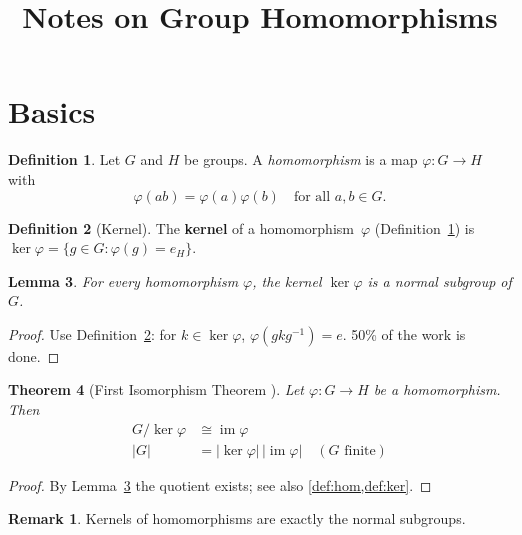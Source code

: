 \documentclass{amsart}
\title{Notes on Group Homomorphisms}
\newtheorem{thm}{Theorem}[section]
\newtheorem{lem}[thm]{Lemma}
\theoremstyle{definition}
\newtheorem{defn}[thm]{Definition}
\newtheorem*{rem}{Remark}
\begin{document}
\maketitle
\section{Basics}
\begin{defn}\label{def:hom}
Let $G$ and $H$ be groups. A \emph{homomorphism} is a map $\varphi\colon G \to H$ with
\[ \varphi(ab) = \varphi(a)\varphi(b) \quad\text{for all } a, b \in G. \]
\end{defn}

\begin{defn}[Kernel]\label{def:ker}
The \textbf{kernel} of a homomorphism~$\varphi$ (Definition~\ref{def:hom}) is
$\ker\varphi = \{g \in G : \varphi(g) = e_H\}$.
\end{defn}

\begin{lem}\label{lem:normal}
For every homomorphism $\varphi$, the kernel $\ker\varphi$ is a normal subgroup of $G$.
\end{lem}
\begin{proof}
Use Definition~\ref{def:ker}: for $k \in \ker\varphi$, $\varphi(gkg^{-1}) = e$. 50\% of the work is done.
\end{proof}

\begin{thm}[First Isomorphism Theorem \cite{lang}]\label{thm:first}
Let $\varphi\colon G\to H$ be a homomorphism. Then
\begin{align}
G/\ker\varphi &\cong \operatorname{im}\varphi \label{eq:iso} \\
|G| &= |\ker\varphi|\,|\operatorname{im}\varphi| \quad (G \text{ finite})
\end{align}
\end{thm}
\begin{proof}
By Lemma~\ref{lem:normal} the quotient exists; see also \cref{def:hom,def:ker}.
\end{proof}

\begin{rem}
Kernels of homomorphisms are exactly the normal subgroups.
\end{rem}
\end{document}
